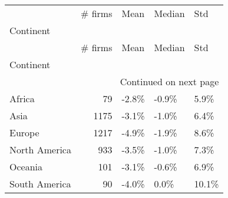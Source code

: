 \begin{longtable}{lrlll}
\toprule
 & \# firms & Mean & Median & Std \\
Continent &  &  &  &  \\
\midrule
\endfirsthead
\toprule
 & \# firms & Mean & Median & Std \\
Continent &  &  &  &  \\
\midrule
\endhead
\midrule
\multicolumn{5}{r}{Continued on next page} \\
\midrule
\endfoot
\bottomrule
\endlastfoot
Africa & 79 & -2.8\% & -0.9\% & 5.9\% \\
Asia & 1175 & -3.1\% & -1.0\% & 6.4\% \\
Europe & 1217 & -4.9\% & -1.9\% & 8.6\% \\
North America & 933 & -3.5\% & -1.0\% & 7.3\% \\
Oceania & 101 & -3.1\% & -0.6\% & 6.9\% \\
South America & 90 & -4.0\% & 0.0\% & 10.1\% \\
\end{longtable}
